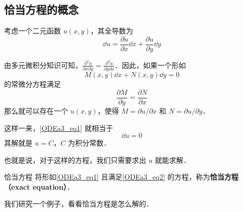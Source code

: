 

\subsection{恰当方程的概念}

考虑一个二元函数 $u(x, y)$，其全导数为
\begin{equation}
\dd u=\frac{\partial u}{\partial x}\dd x+\frac{\partial u}{\partial y}\dd y
\end{equation}

由多元微积分知识可知，$\frac{\partial^2 u}{\partial x\partial y}=\frac{\partial^2 u}{\partial y\partial x}$．因此，如果一个形如
\begin{equation}\label{ODEa3_eq1}
M(x, y)\dd x+N(x, y)\dd y=0
\end{equation}
的常微分方程满足
\begin{equation}\label{ODEa3_eq2}
\frac{\partial M}{\partial y}=\frac{\partial N}{\partial x}
\end{equation}
那么就可以存在一个 $u(x, y)$，使得 $M=\partial u/\partial x$ 和 $N=\partial u/\partial y$．

这样一来，\autoref{ODEa3_eq1} 就相当于
\begin{equation}
\dd u=0
\end{equation}
其解就是 $u=C$，$C$ 为积分常数．

也就是说，对于这样的方程，我们只需要求出 $u$ 就能求解．

\begin{definition}{恰当方程}
将形如\autoref{ODEa3_eq1} 且满足\autoref{ODEa3_eq2} 的方程，称为\textbf{恰当方程（exact equation）}．
\end{definition}

我们研究一个例子，看看恰当方程是怎么解的．

